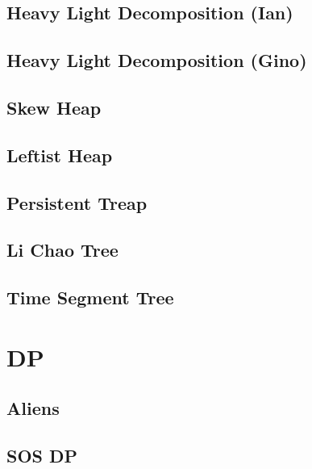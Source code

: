 \documentclass[a4paper,10pt,twocolumn,oneside]{article}
\begin{document}
\subsection{Heavy Light Decomposition (Ian)}


\subsection{Heavy Light Decomposition (Gino)}


\subsection{Skew Heap}


\subsection{Leftist Heap}


\subsection{Persistent Treap}


\subsection{Li Chao Tree}


\subsection{Time Segment Tree}





\section{DP}

\subsection{Aliens}


\subsection{SOS DP}

\end{document}
